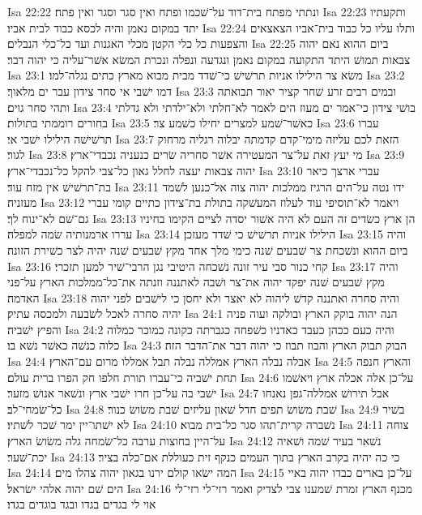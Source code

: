 Isa 22:22  ונתתי מפתח בית־דוד על־שׁכמו ופתח ואין סגר וסגר ואין פתח׃
Isa 22:23  ותקעתיו יתד במקום נאמן והיה לכסא כבוד לבית אביו׃
Isa 22:24  ותלו עליו כל כבוד בית־אביו הצאצאים והצפעות כל כלי הקטן מכלי האגנות ועד כל־כלי הנבלים׃
Isa 22:25  ביום ההוא נאם יהוה צבאות תמושׁ היתד התקועה במקום נאמן ונגדעה ונפלה ונכרת המשׂא אשׁר־עליה כי יהוה דבר׃
Isa 23:1  משׂא צר הילילו אניות תרשׁישׁ כי־שׁדד מבית מבוא מארץ כתים נגלה־למו׃
Isa 23:2  דמו ישׁבי אי סחר צידון עבר ים מלאוך׃
Isa 23:3  ובמים רבים זרע שׁחר קציר יאור תבואתה ותהי סחר גוים׃
Isa 23:4  בושׁי צידון כי־אמר ים מעוז הים לאמר לא־חלתי ולא־ילדתי ולא גדלתי בחורים רוממתי בתולות׃
Isa 23:5  כאשׁר־שׁמע למצרים יחילו כשׁמע צר׃
Isa 23:6  עברו תרשׁישׁה הילילו ישׁבי אי׃
Isa 23:7  הזאת לכם עליזה מימי־קדם קדמתה יבלוה רגליה מרחוק לגור׃
Isa 23:8  מי יעץ זאת על־צר המעטירה אשׁר סחריה שׂרים כנעניה נכבדי־ארץ׃
Isa 23:9  יהוה צבאות יעצה לחלל גאון כל־צבי להקל כל־נכבדי־ארץ׃
Isa 23:10  עברי ארצך כיאר בת־תרשׁישׁ אין מזח עוד׃
Isa 23:11  ידו נטה על־הים הרגיז ממלכות יהוה צוה אל־כנען לשׁמד מעזניה׃
Isa 23:12  ויאמר לא־תוסיפי עוד לעלוז המעשׁקה בתולת בת־צידון כתיים קומי עברי גם־שׁם לא־ינוח לך׃
Isa 23:13  הן ארץ כשׂדים זה העם לא היה אשׁור יסדה לציים הקימו בחיניו עררו ארמנותיה שׂמה למפלה׃
Isa 23:14  הילילו אניות תרשׁישׁ כי שׁדד מעזכן׃
Isa 23:15  והיה ביום ההוא ונשׁכחת צר שׁבעים שׁנה כימי מלך אחד מקץ שׁבעים שׁנה יהיה לצר כשׁירת הזונה׃
Isa 23:16  קחי כנור סבי עיר זונה נשׁכחה היטיבי נגן הרבי־שׁיר למען תזכרי׃
Isa 23:17  והיה מקץ שׁבעים שׁנה יפקד יהוה את־צר ושׁבה לאתננה וזנתה את־כל־ממלכות הארץ על־פני האדמה׃
Isa 23:18  והיה סחרה ואתננה קדשׁ ליהוה לא יאצר ולא יחסן כי לישׁבים לפני יהוה יהיה סחרה לאכל לשׂבעה ולמכסה עתיק׃
Isa 24:1  הנה יהוה בוקק הארץ ובולקה ועוה פניה והפיץ ישׁביה׃
Isa 24:2  והיה כעם ככהן כעבד כאדניו כשׁפחה כגברתה כקונה כמוכר כמלוה כלוה כנשׁה כאשׁר נשׁא בו׃
Isa 24:3  הבוק תבוק הארץ והבוז תבוז כי יהוה דבר את־הדבר הזה׃
Isa 24:4  אבלה נבלה הארץ אמללה נבלה תבל אמללו מרום עם־הארץ׃
Isa 24:5  והארץ חנפה תחת ישׁביה כי־עברו תורת חלפו חק הפרו ברית עולם׃
Isa 24:6  על־כן אלה אכלה ארץ ויאשׁמו ישׁבי בה על־כן חרו ישׁבי ארץ ונשׁאר אנושׁ מזער׃
Isa 24:7  אבל תירושׁ אמללה־גפן נאנחו כל־שׂמחי־לב׃
Isa 24:8  שׁבת משׂושׂ תפים חדל שׁאון עליזים שׁבת משׂושׂ כנור׃
Isa 24:9  בשׁיר לא ישׁתו־יין ימר שׁכר לשׁתיו׃
Isa 24:10  נשׁברה קרית־תהו סגר כל־בית מבוא׃
Isa 24:11  צוחה על־היין בחוצות ערבה כל־שׂמחה גלה משׂושׂ הארץ׃
Isa 24:12  נשׁאר בעיר שׁמה ושׁאיה יכת־שׁער׃
Isa 24:13  כי כה יהיה בקרב הארץ בתוך העמים כנקף זית כעוללת אם־כלה בציר׃
Isa 24:14  המה ישׂאו קולם ירנו בגאון יהוה צהלו מים׃
Isa 24:15  על־כן בארים כבדו יהוה באיי הים שׁם יהוה אלהי ישׂראל׃
Isa 24:16  מכנף הארץ זמרת שׁמענו צבי לצדיק ואמר רזי־לי רזי־לי אוי לי בגדים בגדו ובגד בוגדים בגדו׃
